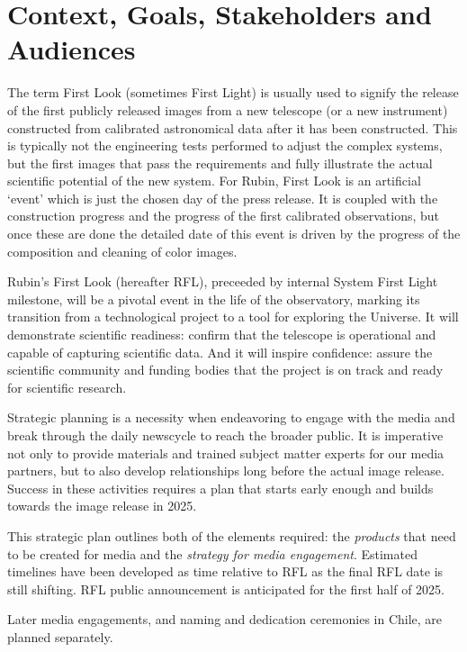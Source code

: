 \section{Context, Goals, Stakeholders and Audiences}

The term First Look (sometimes First Light) is usually used to signify the release of the first publicly released images from a new telescope (or a new instrument) constructed from calibrated astronomical data after it has been constructed. This is typically not the engineering tests performed to adjust the complex systems, but the first images that pass the requirements and fully illustrate the actual scientific potential of the new system. For Rubin, First Look is an artificial ‘event’ which is just the chosen day of the press release. It is coupled with the construction progress and the progress of the first calibrated observations, but once these are done the detailed date of this event is driven by the progress of the composition and cleaning of color images.


Rubin’s First Look (hereafter RFL), preceeded by internal System First Light milestone, will be a pivotal event in the life of the observatory, marking its transition from a technological project to a tool for exploring the Universe. It will demonstrate scientific readiness: confirm that the telescope is operational and capable of capturing scientific data. And it will inspire confidence: assure the scientific community and funding bodies that the project is on track and ready for scientific research.

Strategic planning is a necessity when endeavoring to engage with the media and break through the daily newscycle to reach the broader public. It is imperative not only to provide materials and trained subject matter experts for our media partners, but to also develop relationships long before the actual image release. Success in these activities requires a plan that starts early enough and builds towards the image release in 2025. 

This strategic plan outlines both of the elements required: the {\it products} that need to be created for media and
the {\it strategy for media engagement}. Estimated timelines have been developed as time relative to RFL as the final RFL date
is still shifting. RFL public announcement is anticipated for the first half of 2025. 

Later media engagements, and naming and dedication ceremonies in Chile, are planned separately. 
 

